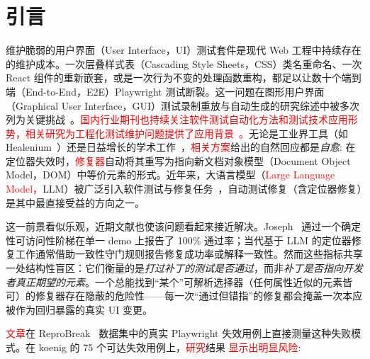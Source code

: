 \documentclass[UTF8, a4paper, 10.5pt, twocolumn, fontset=none]{ctexart}
\newcommand{\rev}[1]{\textcolor{red}{#1}} %
\providecommand{\DIFaddbegin}{} %
\providecommand{\DIFaddend}{} %
\providecommand{\DIFaddtex}[1]{\textcolor{red}{#1}} %
\providecommand{\DIFadd}[1]{\texorpdfstring{\DIFaddtex{#1}}{#1}} %
\providecommand{\DIFaddincludegraphics}[2][]{{\color{blue}\fbox{\DIFOincludegraphics[#1]{#2}}}} %
\DeclareRobustCommand{\DIFaddbegin}{\DIFOaddbegin \let\includegraphics\DIFaddincludegraphics} %
\DeclareRobustCommand{\DIFaddend}{\DIFOaddend \let\includegraphics\DIFOincludegraphics} %
\begin{document}
\begingroup
\renewcommand{\thefootnote}{}
\endgroup
\setcounter{footnote}{0}

\setcounter{section}{-1}
\section{引言}
\label{sec:intro}

维护脆弱的用户界面（User Interface，UI）测试套件是现代 Web 工程中持续存在的维护成本。一次层叠样式表（Cascading Style Sheets，CSS）类名重命名、一次 React 组件的重新嵌套，或是一次行为不变的处理函数重构，都足以让数十个端到端（End-to-End，E2E）Playwright 测试断裂。这一问题在图形用户界面（Graphical User Interface，GUI）测试录制重放与自动生成的研究综述中被多次列为关键挑战~\cite{li2022androidReplay, wang2025mobileGui}。\DIFaddbegin \DIFadd{\rev{国内行业期刊也持续关注软件测试自动化方法和测试技术应用形势，相关研究为工程化测试维护问题提供了应用背景~\cite{yang2017wirelessAutoTest, liu2022wirelessTesting}。}}\DIFaddend 无论是工业界工具（如 Healenium~\cite{healenium}）还是日益增长的学术工作~\cite{joseph2026zerocost, mouraReproBreak2026}，\DIFaddbegin \DIFadd{相关方案}\DIFaddend 给出的自然回应都是\emph{自愈}: 在定位器失效时，\DIFaddbegin \DIFadd{修复器}\DIFaddend 自动将其重写为指向新文档对象模型（Document Object Model，DOM）中等价元素的形式。近年来，大语言模型（\DIFaddbegin \DIFadd{Large Language Model，}\DIFaddend LLM）被广泛引入软件测试与修复任务~\cite{xiang2025llmRepair, li2025llmFuzzing}，自动测试修复（含定位器修复）是其中最直接受益的方向之一。

这一前景看似乐观，近期文献也使该问题看起来接近解决。Joseph~\cite{joseph2026zerocost} 通过一个确定性可访问性阶梯在单一 demo 上报告了 100\% 通过率；当代基于 LLM 的定位器修复工作通常借助一致性守门规则报告修复成功率或解释一致性。然而这些指标共享一处结构性盲区：它们衡量的是\emph{打过补丁的测试是否通过}，而非\emph{补丁是否指向开发者真正期望的元素}。一个总能找到“某个”可解析选择器（任何属性近似的元素皆可）的修复器存在隐蔽的危险性——每一次“通过但错指”的修复都会掩盖一次本应被作为回归暴露的真实 UI 变更。

 \DIFaddbegin \DIFadd{文章}\DIFaddend 在 ReproBreak~\cite{mouraReproBreak2026} 数据集中的真实 Playwright 失效用例上直接测量这种失败模式。在 koenig 的 75 个可达失效用例上，\DIFaddbegin \DIFadd{研究}\DIFaddend 结果 \DIFaddbegin \DIFadd{显示出明显风险}\DIFaddend :
\end{document}
